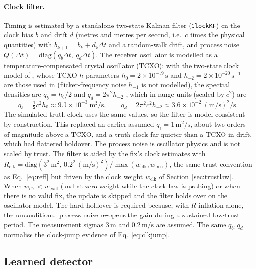 \documentclass[journal]{IEEEtran}
\begin{document}
\paragraph{Clock filter.}
Timing is estimated by a standalone two-state Kalman filter (\texttt{ClockKF}) on the clock bias $b$ and
drift $d$ (metres and metres per second, i.e.\ $c$ times the physical quantities) with
$b_{k+1} = b_k + d_k\Delta t$ and a random-walk drift, and process noise
$Q(\Delta t) = \mathrm{diag}(q_b\Delta t,\ q_d\Delta t)$. The receiver oscillator is modelled as a
temperature-compensated crystal oscillator (TCXO): with the two-state clock model of
\cite{brown2012introduction}, whose TCXO $h$-parameters $h_0 = 2\times10^{-19}\,\mathrm{s}$ and
$h_{-2} = 2\times10^{-20}\,\mathrm{s^{-1}}$ are those used in \cite{krawinkel2021improved} (flicker-frequency noise
$h_{-1}$ is not modelled), the spectral densities are $q_b = h_0/2$ and $q_d = 2\pi^2 h_{-2}$
\cite{qin2021benefits}, which in range units (scaled by $c^2$) are
\begin{equation}
q_b = \tfrac{1}{2}c^2 h_0 \approx 9.0\times10^{-3}\ \mathrm{m^2/s},\qquad
q_d = 2\pi^2 c^2 h_{-2} \approx 3.6\times10^{-2}\ \mathrm{(m/s)^2/s}.
\label{eq:tcxo}
\end{equation}
The simulated truth clock uses the same values, so the filter is model-consistent by construction. This
replaced an earlier assumed $q_b = 1\,\mathrm{m^2/s}$, about two orders of magnitude above a TCXO, and a truth
clock far quieter than a TCXO in drift, which had flattered holdover. The process noise is oscillator physics and
is not scaled by trust. The filter is aided by the fix's clock estimates with
$R_{\mathrm{clk}} = \mathrm{diag}(3^2\,\mathrm{m}^2,\ 0.2^2\,(\mathrm{m/s})^2)/\max(w_{\mathrm{clk}}, w_{\min})$,
the same trust convention as Eq.~\eqref{eq:reff} but driven by the clock weight $w_{\mathrm{clk}}$ of
Section~\ref{sec:trustlaw}. When $w_{\mathrm{clk}} < w_{\mathrm{excl}}$ (and at zero weight while the clock law
is probing) or when there is no valid fix, the update is skipped and the filter holds over on the oscillator
model. The hard holdover is required because, with $R$-inflation alone, the unconditional process noise re-opens
the gain during a sustained low-trust period. The measurement sigmas $3\,\mathrm{m}$ and $0.2\,\mathrm{m/s}$
are assumed. The same $q_b, q_d$ normalise the clock-jump evidence of Eq.~\eqref{eq:clkjump}.

\subsection{Learned detector}
\label{sec:detector}
\end{document}
